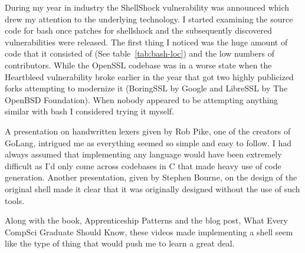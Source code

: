 During my year in industry the ShellShock\cite{SHELLSHOCK-CVE,SHELLSHOCK-LWN,SHELLSHOCK-SYMANTEC} vulnerability was announced which drew my attention to the underlying technology.
I started examining the source code for bash once patches for shellshock and the subsequently discovered vulnerabilities were released.
The first thing I noticed was the huge amount of code that it consisted of (See table~\ref{tab:bash-loc}) and the low numbers of contributors.
While the OpenSSL codebase was in a worse state when the Heartbleed vulnerability broke earlier in the year that got two highly publicized forks attempting to modernize it (BoringSSL by Google\cite{BORINGSSL} and LibreSSL by The OpenBSD Foundation\cite{LIBRESSL}).
When nobody appeared to be attempting anything similar with bash I considered trying it myself.

A presentation on handwritten lexers\cite{PIKE-LEXING-VIDEO} given by Rob Pike, one of the creators of GoLang, intrigued me as everything seemed so simple and easy to follow. 
I had always assumed that implementing any language would have been extremely difficult as I'd only come across codebases in C that made heavy use of code generation.
Another presentation, given by Stephen Bourne, on the design of the original shell\cite{DESIGN-OF-SH-VIDEO} made it clear that it was originally designed without the use of such tools.

Along with the book, Apprenticeship Patterns\cite{APPRENTICESHIP-PATTERNS} and the blog post, What Every CompSci Graduate Should Know\cite{EVERY-COMPSCI-GRAD}, these videos made implementing a shell seem like the type of thing that would push me to learn a great deal.

